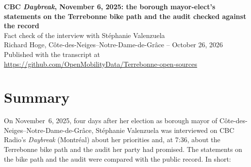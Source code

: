 \documentclass[11pt,letterpaper]{article}
\newcommand{\repourl}{https://github.com/OpenMobilityData/Terrebonne-open-sources}
\newcommand{\repo}[1]{\href{\repourl}{#1}}
\begin{document}
\begin{center}
{\Large\bfseries CBC \emph{Daybreak}, November 6, 2025: the borough mayor-elect's statements on the Terrebonne bike path and the audit checked against the record}\\[0.4em]
{\large Fact check of the interview with Stéphanie Valenzuela}\\[0.6em]
Richard Hoge, Côte-des-Neiges--Notre-Dame-de-Grâce -- October 26, 2026\\
Published with the transcript at \repo{\repourl}
\end{center}

\section*{Summary}

On November~6, 2025, four days after her election as borough mayor of
Côte-des-Neiges--Notre-Dame-de-Grâce, Stéphanie Valenzuela was interviewed on
CBC Radio's \emph{Daybreak} (Montréal) about her priorities and, at 7:36, about
the Terrebonne bike path and the audit her party had promised. The statements
on the bike path and the audit were compared with the public record. In short:
\end{document}

